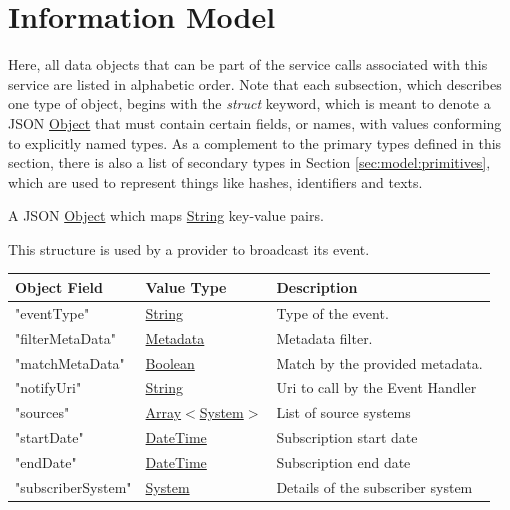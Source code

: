 \documentclass[a4paper]{arrowhead}
\newcommand{\pref}[1]{{\textcolor{ArrowheadGrey}{\hyperref[sec:model:primitives:#1]{#1}}}}
\begin{document}
\section{Information Model}
\label{sec:model}

Here, all data objects that can be part of the service calls associated with this service are listed in alphabetic order.
Note that each subsection, which describes one type of object, begins with the \textit{struct} keyword, which is meant to denote a JSON \pref{Object} that must contain certain fields, or names, with values conforming to explicitly named types.
As a complement to the primary types defined in this section, there is also a list of secondary types in Section \ref{sec:model:primitives}, which are used to represent things like hashes, identifiers and texts.


A JSON \pref{Object} which maps \pref{String} key-value pairs.


This structure is used by a provider to broadcast its event.

\begin{table}[ht!]
\begin{tabularx}{\textwidth}{| p{5cm} | p{5cm} | X |} \hline
\rowcolor{gray!33} Object Field & Value Type      & Description \\ \hline
"eventType"        & \pref{String}                      & Type of the event. \\ \hline
"filterMetaData"   & \pref{Metadata}                    & Metadata filter.\\ \hline
"matchMetaData"    & \pref{Boolean}                     & Match by the provided metadata. \\ \hline
"notifyUri"        & \pref{String}                      & Uri to call by the Event Handler \\ \hline
"sources"          & \pref{Array}$<$\pref{System}$>$    & List of source systems \\ \hline
"startDate"        & \pref{DateTime}                    & Subscription start date \\ \hline
"endDate"          & \pref{DateTime}                    & Subscription end date \\ \hline
"subscriberSystem" & \pref{System}                      & Details of the subscriber system \\ \hline
\end{tabularx}
\end{table}
\end{document}

